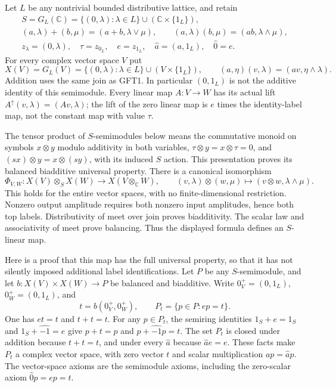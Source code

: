 Let $L$ be any nontrivial bounded distributive lattice, and retain
\begin{equation}\tag{GFT1}
\begin{gathered}
 S=G_L(\mathbb C)=\{(0,\lambda):\lambda\in L\}
                       \cup(\mathbb C\times\{1_L\}),\\
 (a,\lambda)+(b,\mu)=(a+b,\lambda\vee\mu),\qquad
 (a,\lambda)(b,\mu)=(ab,\lambda\wedge\mu),\\
 z_\lambda=(0,\lambda),\quad \tau=z_{0_L},\quad
 e=z_{1_L},\quad \widehat a=(a,1_L),\quad \widehat0=e.
\end{gathered}
\end{equation}
For every complex vector space $V$ put
\begin{equation}\tag{GFT2}
 X(V)=G_L(V)=\{(0,\lambda):\lambda\in L\}
                          \cup(V\times\{1_L\}),\qquad
 (a,\eta)(v,\lambda)=(av,\eta\wedge\lambda).
\end{equation}
Addition uses the same join as GFT1. In particular $(0,1_L)$ is
not the additive identity of this semimodule. Every linear map
$A:V\to W$ has its actual lift
$A^\uparrow(v,\lambda)=(Av,\lambda)$; the lift of the zero
linear map is $e$ times the identity-label map, not the constant
map with value $\tau$.

The tensor product of $S$-semimodules below means the commutative
monoid on symbols $x\otimes y$ modulo additivity in both variables,
$\tau\otimes y=x\otimes\tau=0$, and
$(sx)\otimes y=x\otimes(sy)$, with its induced $S$ action.
This presentation proves its balanced biadditive universal property.
There is a canonical isomorphism
\begin{equation}\tag{GFT3}
 \Phi_{V,W}:X(V)\otimes_S X(W)\longrightarrow
                 X(V\otimes_{\mathbb C}W),\qquad
 (v,\lambda)\otimes(w,\mu)\longmapsto
                 (v\otimes w,\lambda\wedge\mu).
\end{equation}
This holds for the entire vector spaces, with no finite-dimensional
restriction. Nonzero output amplitude requires both nonzero input
amplitudes, hence both top labels. Distributivity of meet over join
proves biadditivity. The scalar law and associativity of meet prove
balancing. Thus the displayed formula defines an $S$-linear map.

Here is a proof that this map has the full universal property, so
that it has not silently imposed additional label identifications.
Let $P$ be any $S$-semimodule, and let
$b:X(V)\times X(W)\to P$ be balanced and biadditive. Write
$0_V^+=(0,1_L)$, $0_W^+=(0,1_L)$, and
\begin{equation}\tag{GFT4}
 t=b(0_V^+,0_W^+),\qquad P_t=\{p\in P:ep=t\}.
\end{equation}
One has $et=t$ and $t+t=t$. For any $p\in P_t$, the semiring
identities $1_S+e=1_S$ and $1_S+\widehat{-1}=e$ give
$p+t=p$ and $p+\widehat{-1}p=t$. The set $P_t$ is closed under
addition because $t+t=t$, and under every $\widehat a$ because
$\widehat a e=e$. These facts make $P_t$ a complex vector space,
with zero vector $t$ and scalar multiplication $a p=\widehat a p$.
The vector-space axioms are the semimodule axioms, including the
zero-scalar axiom $\widehat0 p=ep=t$.


